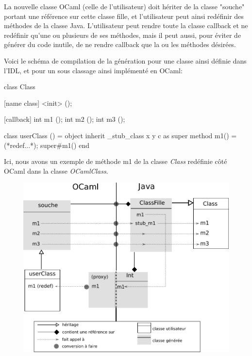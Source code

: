 \documentclass[a4paper, 11pt]{article}
\begin{document}
La nouvelle classe OCaml (celle de l'utilisateur) doit hériter de la classe "souche" portant une référence sur cette classe fille, et l'utilisateur peut ainsi redéfinir des méthodes de la classe Java.
L'utilisateur peut rendre toute la classe callback et ne redéfinir qu'une ou plusieurs de ses méthodes, mais il peut aussi, pour éviter de générer du code inutile, de ne rendre callback que la ou les méthodes désirées.

Voici le schéma de compilation de la génération pour une classe ainsi définie dans l'IDL, et pour un sous classage ainsi implémenté en OCaml:
\begin{multicols}{2}
\begin{idlEx}
 class Class {

   [name class] <init> ();

   [callback] int m1 ();
   int m2 ();
   int m3 ();
 }
\end{idlEx}

\begin{OCamlEx}
class userClass ()  =
  object
    inherit _stub_class x y c as super
    method m1() = (*redef...*);
                  super#m1()
  end
\end{OCamlEx}

\end{multicols}
Ici, nous avons un exemple de méthode m1 de la classe \emph{Class} redéfinie côté OCaml dans la classe \emph{OCamlClass}.
\begin{figure}[h!]
  \centering
  \includegraphics[scale=0.8]{schemaCBClass.pdf}
\end{figure}
\end{document}
